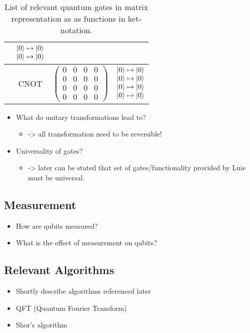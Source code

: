 \begin{table}[htp]
\begin{tabular}{c|c|cc}
                                    & $\begin{matrix} \ket{0} \mapsto \ket{0} \\ \ket{0} \mapsto \ket{0} \end{matrix}$             \\ \hline
                                 & CNOT     
                                    & $\begin{pmatrix} 0 & 0 & 0 & 0\\ 0 & 0 & 0 & 0\\ 0 & 0 & 0 & 0\\ 0 & 0 & 0 & 0 \end{pmatrix}$       
                                    & $\begin{matrix} \ket{0} \mapsto \ket{0} \\ \ket{0} \mapsto \ket{0} \\ \ket{0} \mapsto \ket{0} \\ \ket{0} \mapsto \ket{0} \end{matrix}$            
    \end{tabular}
    \caption{List of relevant quantum gates in matrix representation as as functions in ket-notation.}
    \label{Tab:gates}
\end{table}

\begin{itemize}
    \item What do unitary transformations lead to?
    \begin{itemize}
        \item -> all transformation need to be reversible!
    \end{itemize}
    \item Universality of gates? 
    \begin{itemize}
        \item -> later can be stated that set of gates/functionality provided by Luie must be universal.
    \end{itemize}
\end{itemize}

\subsection{Measurement}
\begin{itemize}
    \item How are qubits measured?
    \item What is the effect of measurement on qubits?
\end{itemize}

\subsection{Relevant Algorithms}
\begin{itemize}
    \item Shortly describe algorithms referenced later
    \item QFT (Quantum Fourier Transform) 
    \item Shor's algorithm 
\end{itemize}
